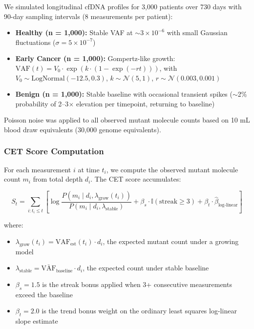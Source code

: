 \documentclass[10pt,a4paper]{article}
\begin{document}
We simulated longitudinal cfDNA profiles for 3,000 patients over 730 days with 90-day sampling intervals (8 measurements per patient):

\begin{itemize}
\item \textbf{Healthy (n = 1,000):} Stable VAF at $\sim 3 \times 10^{-6}$ with small Gaussian fluctuations ($\sigma = 5 \times 10^{-7}$)
\item \textbf{Early Cancer (n = 1,000):} Gompertz-like growth: $\text{VAF}(t) = V_0 \cdot \exp(k \cdot (1 - \exp(-rt)))$, with $V_0 \sim \text{LogNormal}(-12.5, 0.3)$, $k \sim \mathcal{N}(5, 1)$, $r \sim \mathcal{N}(0.003, 0.001)$
\item \textbf{Benign (n = 1,000):} Stable baseline with occasional transient spikes ($\sim$2\% probability of 2--3$\times$ elevation per timepoint, returning to baseline)
\end{itemize}

Poisson noise was applied to all observed mutant molecule counts based on 10 mL blood draw equivalents (30,000 genome equivalents).

\subsubsection{CET Score Computation}

For each measurement $i$ at time $t_i$, we compute the observed mutant molecule count $m_i$ from total depth $d_i$. The CET score accumulates:

\begin{equation}
S_t = \sum_{i: t_i \leq t} \left[ \log \frac{P(m_i \mid d_i, \lambda_{\text{grow}}(t_i))}{P(m_i \mid d_i, \lambda_{\text{stable}})} + \beta_s \cdot \mathbb{I}(\text{streak} \geq 3) + \beta_t \cdot \hat{\beta}_{\text{log-linear}} \right]
\end{equation}

where:
\begin{itemize}
\item $\lambda_{\text{grow}}(t_i) = \text{VAF}_{\text{est}}(t_i) \cdot d_i$, the expected mutant count under a growing model
\item $\lambda_{\text{stable}} = \bar{\text{VAF}}_{\text{baseline}} \cdot d_i$, the expected count under stable baseline
\item $\beta_s = 1.5$ is the streak bonus applied when 3+ consecutive measurements exceed the baseline
\item $\beta_t = 2.0$ is the trend bonus weight on the ordinary least squares log-linear slope estimate
\end{itemize}
\end{document}
